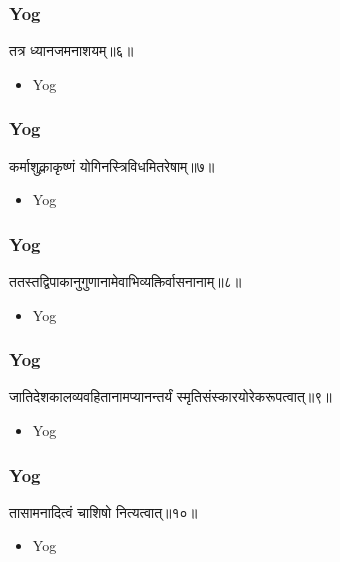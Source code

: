 \begin{frame}[fragile]\frametitle{Yog}
\begin{sanskrit}
तत्र ध्यानजमनाशयम्॥६॥
\end{sanskrit}
	\begin{itemize}
	\item Yog 
	\end{itemize}
\end{frame}



\begin{frame}[fragile]\frametitle{Yog}
\begin{sanskrit}
कर्माशुक्लाकृष्णं योगिनस्त्रिविधमितरेषाम्॥७॥
\end{sanskrit}
	\begin{itemize}
	\item Yog 
	\end{itemize}
\end{frame}


\begin{frame}[fragile]\frametitle{Yog}
\begin{sanskrit}
ततस्तद्विपाकानुगुणानामेवाभिव्यक्तिर्वासनानाम्॥८॥
\end{sanskrit}
	\begin{itemize}
	\item Yog 
	\end{itemize}
\end{frame}

\begin{frame}[fragile]\frametitle{Yog}
\begin{sanskrit}
जातिदेशकालव्यवहितानामप्यानन्तर्यं स्मृतिसंस्कारयोरेकरूपत्वात्॥९॥
\end{sanskrit}
	\begin{itemize}
	\item Yog 
	\end{itemize}
\end{frame}


\begin{frame}[fragile]\frametitle{Yog}
\begin{sanskrit}
तासामनादित्वं चाशिषो नित्यत्वात्॥१०॥
\end{sanskrit}
	\begin{itemize}
	\item Yog 
	\end{itemize}
\end{frame}

